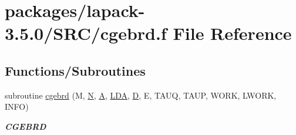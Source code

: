 \hypertarget{cgebrd_8f}{}\section{packages/lapack-\/3.5.0/\+S\+R\+C/cgebrd.f File Reference}
\label{cgebrd_8f}
\subsection*{Functions/\+Subroutines}
\begin{DoxyCompactItemize}
\item 
subroutine \hyperlink{group__complexGEcomputational_ga9f4ec4d67a5ab8355936f6252defa8f5}{cgebrd} (M, \hyperlink{polmisc_8c_a0240ac851181b84ac374872dc5434ee4}{N}, \hyperlink{classA}{A}, \hyperlink{example__user_8c_ae946da542ce0db94dced19b2ecefd1aa}{L\+D\+A}, \hyperlink{odrpack_8h_a7dae6ea403d00f3687f24a874e67d139}{D}, E, T\+A\+U\+Q, T\+A\+U\+P, W\+O\+R\+K, L\+W\+O\+R\+K, I\+N\+F\+O)
\begin{DoxyCompactList}\small\item\em {\bfseries C\+G\+E\+B\+R\+D} \end{DoxyCompactList}\end{DoxyCompactItemize}
